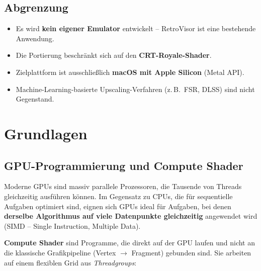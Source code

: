 \documentclass[11pt, a4paper]{article}
\begin{document}
\vspace{.75cm}
\subsection{Abgrenzung}
\vspace{.75cm}
\begin{itemize}[leftmargin=*, nosep]
    \item Es wird \textbf{kein eigener Emulator} entwickelt -- RetroVisor ist eine bestehende Anwendung. \\
    \item Die Portierung beschr\"ankt sich auf den \textbf{CRT-Royale-Shader}. \\
    \item Zielplattform ist ausschlie\ss lich \textbf{macOS mit Apple Silicon} (Metal API). \\
    \item Machine-Learning-basierte Upscaling-Verfahren (z.\,B.\ FSR, DLSS) sind nicht Gegenstand.
\end{itemize}

\newpage
\vspace*{-.5cm}
\section{Grundlagen}
\vspace{.5cm}

\subsection{GPU-Programmierung und Compute Shader}
\vspace{.5cm}
Moderne GPUs sind massiv parallele Prozessoren, die Tausende von Threads gleichzeitig \newline ausf\"uhren k\"onnen. Im Gegensatz zu CPUs, die f\"ur sequentielle Aufgaben optimiert sind, eignen sich GPUs ideal f\"ur Aufgaben, bei denen \textbf{derselbe Algorithmus auf viele Datenpunkte gleichzeitig} angewendet wird (SIMD -- Single Instruction, Multiple Data). \vspace{.25cm}

\textbf{Compute Shader} sind Programme, die direkt auf der GPU laufen und nicht an die klassische Grafikpipeline (Vertex $\rightarrow$ Fragment) gebunden sind. Sie arbeiten auf einem flexiblen Grid aus \textit{Threadgroups}:
\end{document}
